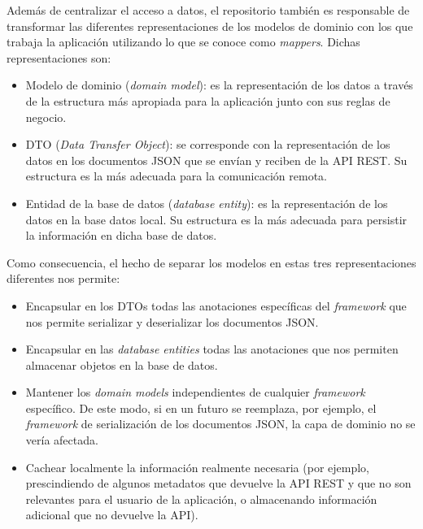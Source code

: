 Además de centralizar el acceso a datos, el repositorio también es responsable de transformar las diferentes representaciones de los modelos de dominio con los que trabaja la aplicación utilizando lo que se conoce como \emph{mappers}. Dichas representaciones son:

\vspace{-0.3cm}
\begin{itemize} [\textbullet]
	\item Modelo de dominio (\emph{domain model}): es la representación de los datos a través de la estructura más apropiada para la aplicación junto con sus reglas de negocio.
	\item DTO (\emph{Data Transfer Object}): se corresponde con la representación de los datos en los documentos JSON que se envían y reciben de la API REST. Su estructura es la más adecuada para la comunicación remota.
	\item Entidad de la base de datos (\emph{database entity}): es la representación de los datos en la base datos local. Su estructura es la más adecuada para persistir la información en dicha base de datos.
\end{itemize}

Como consecuencia, el hecho de separar los modelos en estas tres representaciones diferentes nos permite:

\vspace{-0.3cm}
\begin{itemize} [\textbullet]
	\item Encapsular en los DTOs todas las anotaciones específicas del \emph{framework} que nos permite serializar y deserializar los documentos JSON.
	
	\item Encapsular en las \emph{database entities} todas las anotaciones que nos permiten almacenar objetos en la base de datos.
	
	\item Mantener los \emph{domain models} independientes de cualquier \emph{framework} específico. De este modo, si en un futuro se reemplaza, por ejemplo, el \emph{framework} de serialización de los documentos JSON, la capa de dominio no se vería afectada.
	
	\item Cachear localmente la información realmente necesaria (por ejemplo, prescindiendo de algunos metadatos que devuelve la API REST y que no son relevantes para el usuario de la aplicación, o almacenando información adicional que no devuelve la API).
\end{itemize}


